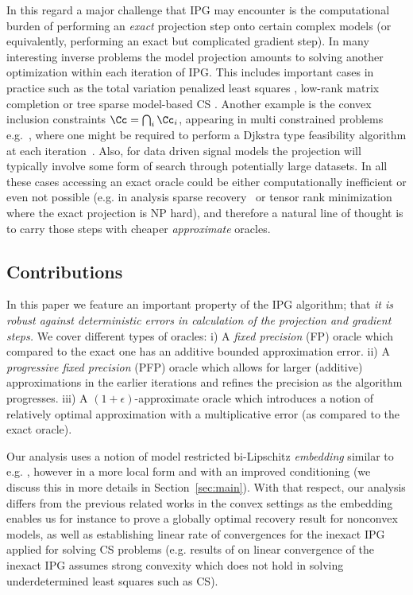 In this regard a major challenge that IPG may encounter is the computational burden of performing an \emph{exact} projection step onto certain complex models (or equivalently, performing an exact but complicated gradient step). In many interesting inverse problems the model projection amounts to solving another optimization within each iteration of IPG. This includes important cases in practice such as the total variation penalized least squares \cite{Chambolle2011,TVprojGabirel}, low-rank matrix completion \cite{Ma2011} or tree sparse model-based CS \cite{modelbasedCS}. Another example is the convex inclusion constraints $\Cc=\bigcap_i \Cc_i$, appearing in multi constrained problems e.g.~\cite{SPCA,LRJS}, where one might be required to perform  a Djkstra type feasibility algorithm at each iteration~\cite{Dykstra,Dykstra2}. Also, for data driven signal models the projection will typically involve some form of search through potentially large datasets. 
In all these cases accessing an exact oracle could be either computationally inefficient or even not possible (e.g. in analysis sparse recovery~\cite{GiryIPGaprox} or  tensor rank minimization~\cite{Holger:tensor} where the exact projection is NP hard), and therefore a natural line of thought is to carry those steps with cheaper \emph{approximate} oracles.

\subsection{Contributions}
In this paper we feature an important property of the IPG algorithm; that \emph{it is robust against deterministic  errors in calculation of the projection and gradient steps.} 
We cover different types of oracles: i) A \emph{fixed precision} (FP) oracle which compared to the exact one has an additive bounded approximation error.  ii) A \emph{progressive fixed precision} (PFP) oracle which allows for larger (additive) approximations in the earlier iterations and refines the precision as the algorithm  progresses. iii) A $(1+\epsilon)$-approximate oracle which introduces a notion of relatively optimal approximation with a multiplicative error (as compared to the exact oracle). 

Our analysis uses a notion of model restricted bi-Lipschitz \emph{embedding} similar to e.g. \cite{Blumen}, however in a more local form and with an improved conditioning (we discuss this in more details in Section~\ref{sec:main}). 
With that respect, our analysis differs from the previous related works in the convex settings as the embedding  enables us for instance to prove a globally optimal recovery result for nonconvex models, as well as establishing linear rate of convergences for the inexact IPG applied for solving CS problems (e.g. results of \cite{BachinexactIPG} on linear convergence of the inexact IPG assumes strong convexity which does not hold in solving underdetermined least squares such as CS). 

